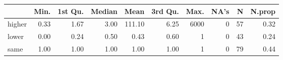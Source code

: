 \begin{table}[ht]
\centering
\begin{tabular}{lrrrrrrrrr}
  \hline
 & Min. & 1st Qu. & Median & Mean & 3rd Qu. & Max. & NA's & N & N.prop \\ 
  \hline
higher & 0.33 & 1.67 & 3.00 & 111.10 & 6.25 & 6000 &   0 &  57 & 0.32 \\ 
  lower & 0.00 & 0.24 & 0.50 & 0.43 & 0.60 &   1 &   0 &  43 & 0.24 \\ 
  same & 1.00 & 1.00 & 1.00 & 1.00 & 1.00 &   1 &   0 &  79 & 0.44 \\ 
   \hline
\end{tabular}
\end{table}
